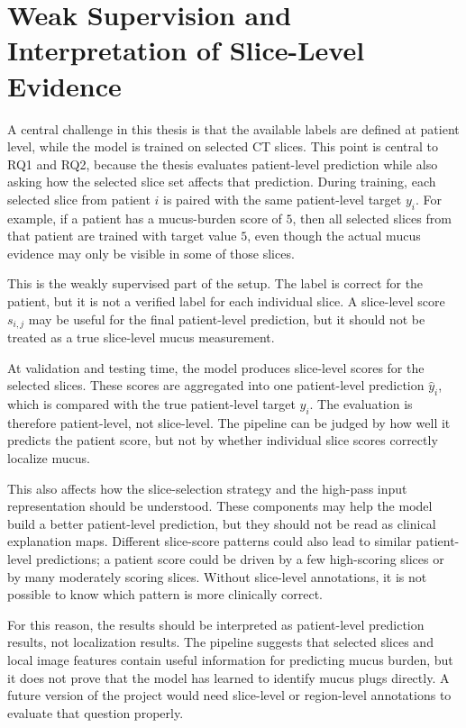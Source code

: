 \section{Weak Supervision and Interpretation of Slice-Level Evidence}
A central challenge in this thesis is that the available labels are defined at patient level, while the model is trained on selected CT slices. This point is central to RQ1 and RQ2, because the thesis evaluates patient-level prediction while also asking how the selected slice set affects that prediction. During training, each selected slice from patient \(i\) is paired with the same patient-level target \(y_i\). For example, if a patient has a mucus-burden score of \(5\), then all selected slices from that patient are trained with target value \(5\), even though the actual mucus evidence may only be visible in some of those slices.

This is the weakly supervised part of the setup. The label is correct for the patient, but it is not a verified label for each individual slice. A slice-level score \(s_{i,j}\) may be useful for the final patient-level prediction, but it should not be treated as a true slice-level mucus measurement.

At validation and testing time, the model produces slice-level scores for the selected slices. These scores are aggregated into one patient-level prediction \(\hat{y}_i\), which is compared with the true patient-level target \(y_i\). The evaluation is therefore patient-level, not slice-level. The pipeline can be judged by how well it predicts the patient score, but not by whether individual slice scores correctly localize mucus.

This also affects how the slice-selection strategy and the high-pass input representation should be understood. These components may help the model build a better patient-level prediction, but they should not be read as clinical explanation maps. Different slice-score patterns could also lead to similar patient-level predictions; a patient score could be driven by a few high-scoring slices or by many moderately scoring slices. Without slice-level annotations, it is not possible to know which pattern is more clinically correct.

For this reason, the results should be interpreted as patient-level prediction results, not localization results. The pipeline suggests that selected slices and local image features contain useful information for predicting mucus burden, but it does not prove that the model has learned to identify mucus plugs directly. A future version of the project would need slice-level or region-level annotations to evaluate that question properly.


